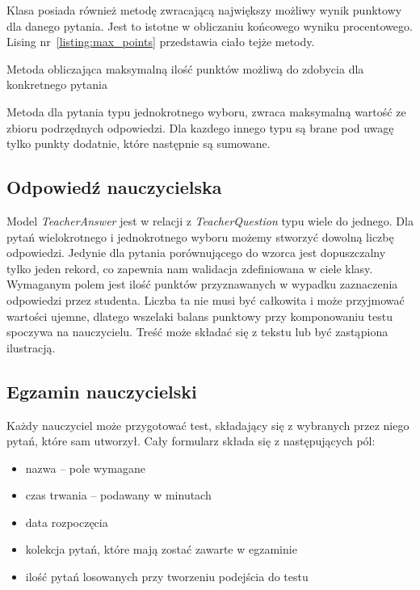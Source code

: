 \documentclass[12pt,twoside]{report}
\begin{document}
Klasa posiada również metodę zwracającą największy możliwy wynik punktowy dla danego
pytania. Jest to istotne w obliczaniu końcowego wyniku procentowego. Lising
nr~\ref{listing:max_points} przedstawia ciało tejże metody.

\begin{listing}
  
  \caption{Metoda obliczająca maksymalną ilość punktów możliwą do zdobycia dla konkretnego pytania}
  \label{listing:max_points}
\end{listing}


Metoda dla pytania typu jednokrotnego wyboru, zwraca maksymalną wartość ze zbioru
podrzędnych odpowiedzi. Dla kazdego innego typu są brane pod uwagę tylko punkty dodatnie,
które następnie są sumowane.

\subsection{Odpowiedź nauczycielska}
Model \emph{TeacherAnswer} jest w relacji z \emph{TeacherQuestion} typu wiele do jednego.
Dla pytań wielokrotnego i jednokrotnego wyboru możemy stworzyć dowolną liczbę odpowiedzi.
Jedynie dla pytania porównującego do wzorca jest dopuszczalny tylko jeden rekord, co
zapewnia nam walidacja zdefiniowana w ciele klasy. Wymaganym polem jest ilość punktów
przyznawanych w wypadku zaznaczenia odpowiedzi przez studenta. Liczba ta nie musi być
całkowita i może przyjmować wartości ujemne, dlatego wszelaki balans punktowy przy
komponowaniu testu spoczywa na nauczycielu. Treść może składać się z tekstu lub być
zastąpiona ilustracją.

\subsection{Egzamin nauczycielski}
Każdy nauczyciel może przygotować test, składający się z wybranych przez niego pytań,
które sam utworzył. Cały formularz składa się z następujących pól:

\begin{itemize}
  \item{nazwa -- pole wymagane}
  \item{czas trwania -- podawany w minutach}
  \item{data rozpoczęcia}
  \item{kolekcja pytań, które mają zostać zawarte w egzaminie}
  \item{ilość pytań losowanych przy tworzeniu podejścia do testu}
\end{itemize}
\end{document}
